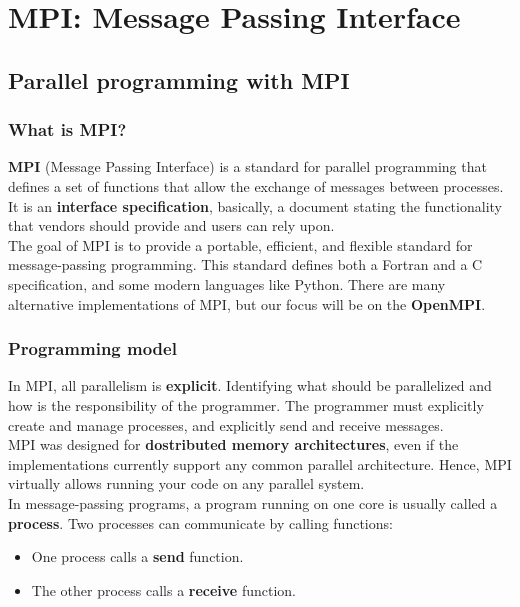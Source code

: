 \chapter{MPI: Message Passing Interface}

\section{Parallel programming with MPI}

\subsection{What is MPI?}

\textbf{MPI} (Message Passing Interface) is a standard for parallel 
programming that defines a set of functions that allow the exchange of messages 
between processes. It is an \textbf{interface specification}, basically, a document stating
the functionality that vendors should provide and users can rely upon.\\

The goal of MPI is to provide a portable, efficient, and flexible standard for
message-passing programming. This standard defines both a Fortran and a C
specification, and some modern languages like Python. There are many alternative
implementations of MPI, but our focus will be on the \textbf{OpenMPI}.

\subsection{Programming model}

In MPI, all parallelism is \textbf{explicit}. Identifying what should be parallelized and
how is the responsibility of the programmer. The programmer must explicitly
create and manage processes, and explicitly send and receive messages.\\

MPI was designed for \textbf{dostributed memory architectures}, even if the implementations
currently support any common parallel architecture. Hence, MPI virtually allows running
your code on any parallel system.\\

In message-passing programs, a program running on one core is usually called a 
\textbf{process}. Two processes can communicate by calling functions:
\begin{itemize}
    \item One process calls a \textbf{send} function.
    \item The other process calls a \textbf{receive} function.
\end{itemize}

